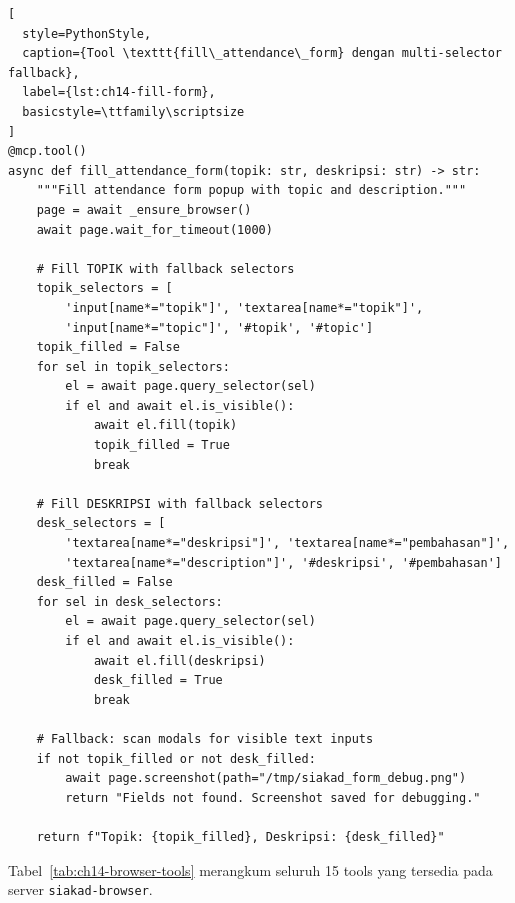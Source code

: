 \begin{lstlisting}[
  style=PythonStyle,
  caption={Tool \texttt{fill\_attendance\_form} dengan multi-selector fallback},
  label={lst:ch14-fill-form},
  basicstyle=\ttfamily\scriptsize
]
@mcp.tool()
async def fill_attendance_form(topik: str, deskripsi: str) -> str:
    """Fill attendance form popup with topic and description."""
    page = await _ensure_browser()
    await page.wait_for_timeout(1000)

    # Fill TOPIK with fallback selectors
    topik_selectors = [
        'input[name*="topik"]', 'textarea[name*="topik"]',
        'input[name*="topic"]', '#topik', '#topic']
    topik_filled = False
    for sel in topik_selectors:
        el = await page.query_selector(sel)
        if el and await el.is_visible():
            await el.fill(topik)
            topik_filled = True
            break

    # Fill DESKRIPSI with fallback selectors
    desk_selectors = [
        'textarea[name*="deskripsi"]', 'textarea[name*="pembahasan"]',
        'textarea[name*="description"]', '#deskripsi', '#pembahasan']
    desk_filled = False
    for sel in desk_selectors:
        el = await page.query_selector(sel)
        if el and await el.is_visible():
            await el.fill(deskripsi)
            desk_filled = True
            break

    # Fallback: scan modals for visible text inputs
    if not topik_filled or not desk_filled:
        await page.screenshot(path="/tmp/siakad_form_debug.png")
        return "Fields not found. Screenshot saved for debugging."

    return f"Topik: {topik_filled}, Deskripsi: {desk_filled}"
\end{lstlisting}

Tabel~\ref{tab:ch14-browser-tools} merangkum seluruh 15 tools yang tersedia pada server \texttt{siakad-browser}.


